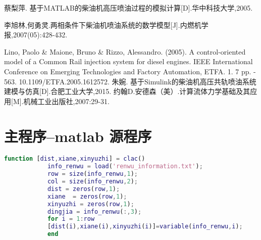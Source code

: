 \documentclass[withoutpreface,bwprint]{cumcmthesis} %
\begin{document}
			
			\begin{thebibliography}{9}%
				 蔡梨萍. 基于MATLAB的柴油机高压喷油过程的模拟计算[D].华中科技大学,2005.
				
				李旭林,何勇灵.两相条件下柴油机喷油系统的数学模型[J].内燃机学报,2007(05):428-432.
				
				Lino, Paolo \& Maione, Bruno \& Rizzo, Alessandro. (2005). A control-oriented model of a Common Rail injection system for diesel engines. IEEE International Conference on Emerging Technologies and Factory Automation, ETFA. 1. 7 pp. - 563. 10.1109/ETFA.2005.1612572. 
				朱婉. 基于Simulink的柴油机高压共轨喷油系统建模与仿真[D].合肥工业大学,2015.
				约翰D.安德森（美）.计算流体力学基础及其应用[M].机械工业出版社,2007:29-31.
				
			\end{thebibliography}
			
			\newpage
			\appendix
			\section{主程序--matlab 源程序}
			\begin{lstlisting}[language=matlab]
			function [dist,xiane,xinyuzhi] = clac()
			info_renwu = load('renwu_information.txt');
			row = size(info_renwu,1);
			col = size(info_renwu,2);
			dist = zeros(row,1);
			xiane  = zeros(row,1);
			xinyuzhi = zeros(row,1);
			dingjia = info_renwu(:,3);
			for i = 1:row
			[dist(i),xiane(i),xinyuzhi(i)]=variable(info_renwu,i); 
			end
			
			\end{lstlisting}
			
\end{document}
